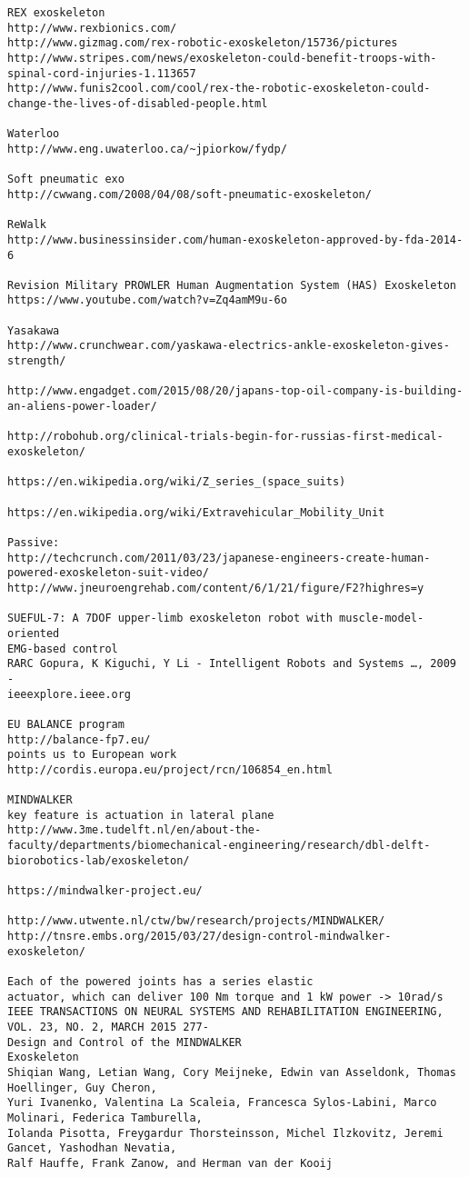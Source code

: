 \documentclass[letterpaper,12pt,fullpage]{article}
\begin{document}
\begin{verbatim}
REX exoskeleton
http://www.rexbionics.com/
http://www.gizmag.com/rex-robotic-exoskeleton/15736/pictures
http://www.stripes.com/news/exoskeleton-could-benefit-troops-with-spinal-cord-injuries-1.113657
http://www.funis2cool.com/cool/rex-the-robotic-exoskeleton-could-change-the-lives-of-disabled-people.html

Waterloo
http://www.eng.uwaterloo.ca/~jpiorkow/fydp/

Soft pneumatic exo
http://cwwang.com/2008/04/08/soft-pneumatic-exoskeleton/

ReWalk
http://www.businessinsider.com/human-exoskeleton-approved-by-fda-2014-6

Revision Military PROWLER Human Augmentation System (HAS) Exoskeleton
https://www.youtube.com/watch?v=Zq4amM9u-6o

Yasakawa
http://www.crunchwear.com/yaskawa-electrics-ankle-exoskeleton-gives-strength/

http://www.engadget.com/2015/08/20/japans-top-oil-company-is-building-an-aliens-power-loader/

http://robohub.org/clinical-trials-begin-for-russias-first-medical-exoskeleton/

https://en.wikipedia.org/wiki/Z_series_(space_suits)

https://en.wikipedia.org/wiki/Extravehicular_Mobility_Unit

Passive:
http://techcrunch.com/2011/03/23/japanese-engineers-create-human-powered-exoskeleton-suit-video/
http://www.jneuroengrehab.com/content/6/1/21/figure/F2?highres=y

SUEFUL-7: A 7DOF upper-limb exoskeleton robot with muscle-model-oriented
EMG-based control
RARC Gopura, K Kiguchi, Y Li - Intelligent Robots and Systems …, 2009 -
ieeexplore.ieee.org

EU BALANCE program
http://balance-fp7.eu/
points us to European work
http://cordis.europa.eu/project/rcn/106854_en.html

MINDWALKER
key feature is actuation in lateral plane
http://www.3me.tudelft.nl/en/about-the-faculty/departments/biomechanical-engineering/research/dbl-delft-biorobotics-lab/exoskeleton/

https://mindwalker-project.eu/

http://www.utwente.nl/ctw/bw/research/projects/MINDWALKER/
http://tnsre.embs.org/2015/03/27/design-control-mindwalker-exoskeleton/

Each of the powered joints has a series elastic
actuator, which can deliver 100 Nm torque and 1 kW power -> 10rad/s
IEEE TRANSACTIONS ON NEURAL SYSTEMS AND REHABILITATION ENGINEERING, VOL. 23, NO. 2, MARCH 2015 277-
Design and Control of the MINDWALKER
Exoskeleton
Shiqian Wang, Letian Wang, Cory Meijneke, Edwin van Asseldonk, Thomas Hoellinger, Guy Cheron,
Yuri Ivanenko, Valentina La Scaleia, Francesca Sylos-Labini, Marco Molinari, Federica Tamburella,
Iolanda Pisotta, Freygardur Thorsteinsson, Michel Ilzkovitz, Jeremi Gancet, Yashodhan Nevatia,
Ralf Hauffe, Frank Zanow, and Herman van der Kooij



\end{verbatim}
\end{document}
